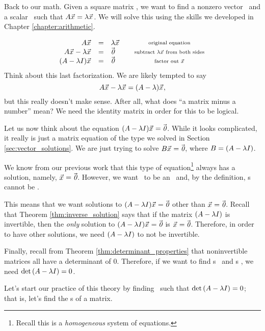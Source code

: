 Back to our math. Given a square matrix \tta, we want to find a nonzero vector \vx\ and a scalar \lda\ such that $A\vec{x_{}} = \lambda\vec{x_{}}$. We will solve this using the skills we developed in Chapter \ref{chapter:arithmetic}.

$$\begin{array}{rclcc}
\tta\vx & = & \lda\vx & &\parbox{100pt}{\centering\scriptsize original equation}\\
\tta\vx - \lda\vx & = & \zero & & \parbox{100pt}{\centering\scriptsize subtract $\lda\vx$ from both sides}\\
(\tta-\lda\tti)\vx & = & \zero & & \parbox{100pt}{\centering\scriptsize factor out \vx}\\
\end{array}$$
Think about this last factorization. We are likely tempted to say $$A\vec{x_{}}-\lambda\vec{x_{}} = (A-\lambda)\vec{x_{}},$$ but this really doesn't make sense. After all, what does ``a matrix minus a number'' mean? We need the identity matrix in order for this to be logical. 

Let us now think about the equation $(A-\lambda I)\vec{x_{}}=\vec{\text{\it 0}}$. While it looks complicated, it really is just a matrix equation of the type we solved in Section \ref{sec:vector_solutions}. We are just trying to solve $B\vec{x_{}}=\vec{\text{\it 0}}$, where $B = (A-\lambda I)$.

We know from our previous work that this type of equation\footnote{Recall this is a \textit{homogeneous} system of equations.} always has a solution, namely, $\vec{x_{}} = \vec{\text{\it 0}}$. However, we want \vx\ to be an \ev\ and, by the definition, \ev s cannot be \zero. 

This means that we want solutions to $(A-\lambda I)\vec{x_{}}=\vec{\text{\it 0}}$ other than $\vec{x_{}}=\vec{\text{\it 0}}$. Recall that Theorem \ref{thm:inverse_solution} says that if the matrix $(A-\lambda I)$ is invertible, then the \textit{only} solution to $(A-\lambda I)\vec{x_{}}=\vec{\text{\it 0}}$ is $\vec{x_{}}=\vec{\text{\it 0}}$. Therefore, in order to have other solutions, we need $(A-\lambda I)$ to not be invertible. 

Finally, recall from Theorem \ref{thm:determinant_properties} that noninvertible matrices all have a determinant of 0. Therefore, if we want to find \el s \lda\ and \ev s \vx, we need $\text{det}\left(A-\lambda I\right) = 0$.

Let's start our practice of this theory by finding \lda\ such that $\text{det}\left(A-\lambda I\right) = 0$; that is, let's find the \el s of a matrix.\\

